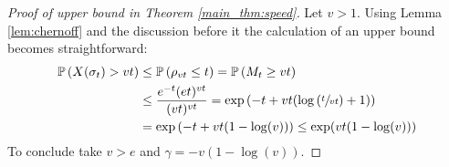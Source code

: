 \begin{proof}[Proof of upper bound in Theorem \ref{main_thm:speed}]
Let $v > 1$. Using Lemma \ref{lem:chernoff} and the discussion before it the calculation of an upper bound becomes straightforward:
\begin{align*}
\mathbb{P} \left( X(\sigma_t) > vt \right) &\leq \mathbb{P} \left( \rho_{vt} \leq t \right) = \mathbb{P} \left( M_t \geq vt \right) \\
                      &\leq \frac{e^{-t}(e t)^{vt}}{(vt)^{vt}} = \exp\left( -t + vt(\log\left(\sfrac{t}{vt}\right) + 1)\right) \\
                      &= \exp\left( -t + vt (1 - \log(v))\right) \leq \exp(vt (1 - \log(v)))
\end{align*}
To conclude take $v > e$ and $\gamma = - v (1 - \log(v))$. 
\end{proof}





